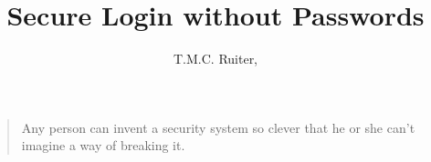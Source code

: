 \documentclass[a4paper,twoside]{article}
\title{Secure Login without Passwords}
\author{T.M.C. Ruiter, \XORlogo}
\begin{document}
\maketitle
\begin{quote}
Any person can invent a security system so clever that he or she can't imagine a way of breaking it.
\end{quote}

\newpage
\tableofcontents










\lstlistoflistings
\end{document}
